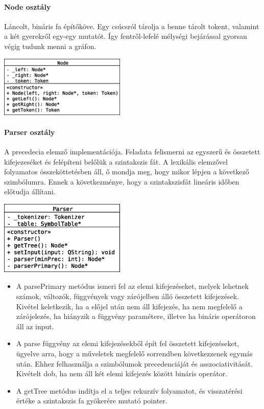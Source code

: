\documentclass[12pt]{report}
\begin{document}
\paragraph{Node osztály}
Láncolt, bináris fa építőköve. Egy csúcsról tárolja a benne tárolt tokent, valamint a két gyerekről egy-egy mutatót. Így fentről-lefelé mélységi bejárással gyorsan végig tudunk menni a gráfon.
\begin{center}
\includegraphics[width=6cm]{pics/uml/Node}
\end{center}

\paragraph{Parser osztály}
A precedecia elemző implementációja. Feladata felismerni az egyszerű és összetett kifejezeséket és felépíteni belőlük a szintakszis fát. A lexikális elemzővel folyamatos összeköttetésben áll, ő mondja meg, hogy mikor lépjen a következő szimbólumra. Ennek a következménye, hogy a szintakszisfát lineáris időben előtudja állítani.
\begin{center}
\includegraphics[width=6cm]{pics/uml/Parser}
\end{center}
\begin{itemize}
\item A parsePrimary metódus ismeri fel az elemi kifejezéseket, melyek lehetnek számok, változók, függvények vagy zárójelben álló összetett kifejezések. Kivétel keletkezik, ha a előjel után nem áll kifejezés, ha nem megfelelő a zárójelezés, ha hiányzik a függvény paramétere, illetve ha bináris operátoron áll az input.
\item A parse függvény az elemi kifejezésekből épít fel összetett kifejezéseket, ügyelve arra, hogy a műveletek megfelelő sorrendben következzenek egymás után. Ehhez felhasználja a szimbólumok precedenciáját és asszociativitását. Kivételt dob, ha nem áll két elemi kifejezés között bináris operátor.
\item A getTree metódus indítja el a teljes rekurzív folyamatot, és visszatérési értéke a szintakszis fa gyökerére mutató pointer. 
\end{itemize}
\end{document}
